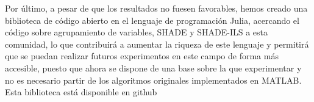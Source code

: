 Por último, a pesar de que los resultados no fuesen favorables, hemos creado una biblioteca de código abierto en el lenguaje de programación Julia, acercando el código sobre agrupamiento de variables, SHADE y SHADE-ILS a esta comunidad, lo que contribuirá a aumentar la riqueza de este lenguaje y permitirá que se puedan realizar futuros experimentos en este campo de forma más accesible, puesto que ahora se dispone de una base sobre la que experimentar y no es necesario partir de los algoritmos originales implementados en MATLAB. Esta biblioteca está disponible en github \cite{biblioteca}

\endinput
